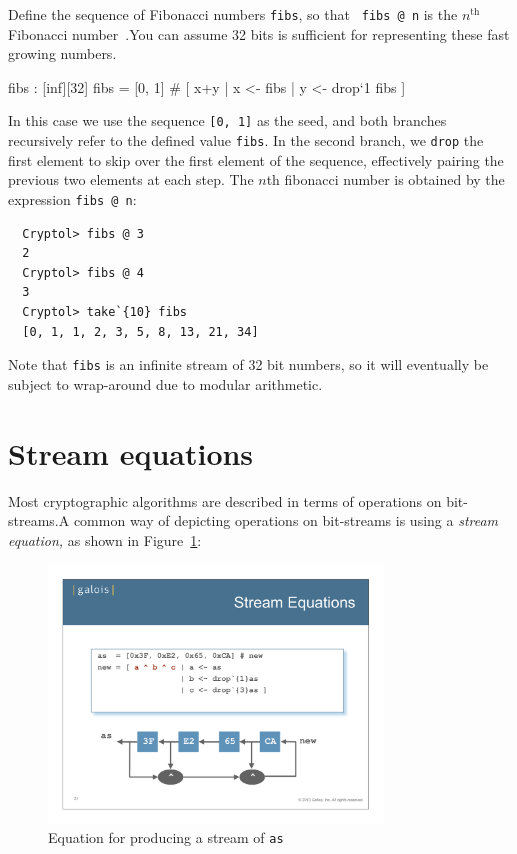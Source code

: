 \begin{Exercise}\label{ex:recfun:5} 
  Define the sequence of Fibonacci numbers {\tt fibs}, so that {\tt
    fibs @ n} is the $n^{\mbox{th}}$ Fibonacci
  number~\cite{wiki:fibonacci}.\glosFibonacci You can assume 32 bits
  is sufficient for representing these fast growing
  numbers. 
\end{Exercise}
\begin{Answer}
\begin{code}
  fibs : [inf][32]
  fibs = [0, 1] # [ x+y | x <- fibs
                        | y <- drop`{1} fibs
                  ]
\end{code}
In this case we use the sequence {\tt [0, 1]} as the seed, and both
branches recursively refer to the defined value {\tt fibs}. In the
second branch, we {\tt drop} the first element to skip over the first
element of the sequence, effectively pairing the previous two elements
at each step.  The $n$th fibonacci number is obtained by the
expression {\tt fibs @ n}:\indDrop
\begin{Verbatim}
  Cryptol> fibs @ 3
  2
  Cryptol> fibs @ 4
  3
  Cryptol> take`{10} fibs
  [0, 1, 1, 2, 3, 5, 8, 13, 21, 34]
\end{Verbatim}
Note that {\tt fibs} is an infinite stream of 32 bit numbers, so it
will eventually be subject to wrap-around due to modular
arithmetic.\indModular
\end{Answer}

\section{Stream equations}
\label{sec:streameq}

Most cryptographic algorithms are described in terms of operations on
bit-streams.\indStreamEquation A common way of depicting operations on
bit-streams is using a {\it stream equation,} as shown in
Figure~\ref{fig:streamDiagram}:
\begin{figure}[htbp]
\centering
\includegraphics[width=3.5in]{crashCourse/streamDiagram.pdf}
\caption{Equation for producing a stream of {\tt as}}
\label{fig:streamDiagram}
\end{figure}

